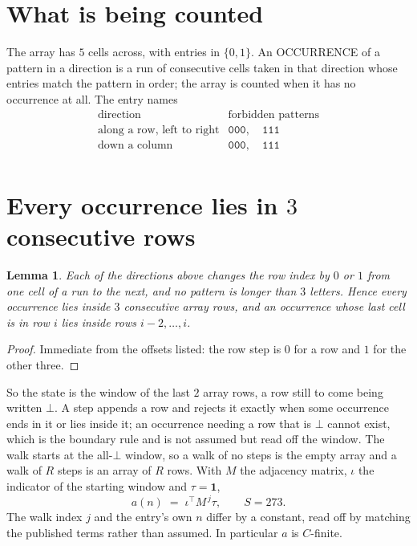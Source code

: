 \documentclass[11pt,a4paper]{article}
\theoremstyle{plain}
\newtheorem{lemma}[theorem]{Lemma}
\theoremstyle{definition}
\begin{document}
\section{What is being counted}

The array has $5$ cells across, with entries in $\{0,1\}$. An OCCURRENCE of a pattern in a
direction is a run of consecutive cells taken in that direction whose entries match the pattern
in order; the array is counted when it has no occurrence at all. The entry names
\[
\begin{array}{ll}
\text{direction} & \text{forbidden patterns} \\[2pt]
\text{along a row, left to right} & \mathtt{000},\quad \mathtt{111} \\
\text{down a column} & \mathtt{000},\quad \mathtt{111} \\
\end{array}
\]


\section{Every occurrence lies in $3$ consecutive rows}

\begin{lemma}\label{lem:win}
Each of the directions above changes the row index by $0$ or $1$ from one cell of a run to the
next, and no pattern is longer than $3$ letters. Hence every occurrence lies inside $3$
consecutive array rows, and an occurrence whose last cell is in row $i$ lies inside rows
$i-2,\dots,i$.
\end{lemma}

\begin{proof}
Immediate from the offsets listed: the row step is $0$ for a row and $1$ for the other three.
\end{proof}

So the state is the window of the last $2$ array rows, a row still to come being written
$\bot$. A step appends a row and rejects it exactly when some occurrence ends in it or lies
inside it; an occurrence needing a row that is $\bot$ cannot exist, which is the boundary rule
and is not assumed but read off the window. The walk starts at the all-$\bot$ window, so a walk
of no steps is the empty array and a walk of $R$ steps is an array of $R$ rows. With $M$ the
adjacency matrix, $\iota$ the indicator of the starting window and $\tau=\mathbf{1}$,
\[
a(n)\;=\;\iota^{\!\top}M^{\,j}\tau ,\qquad S=273.
\]
The walk index $j$ and the entry's own $n$ differ by a constant, read off by matching the
published terms rather than assumed. In particular $a$ is $C$-finite.
\end{document}
